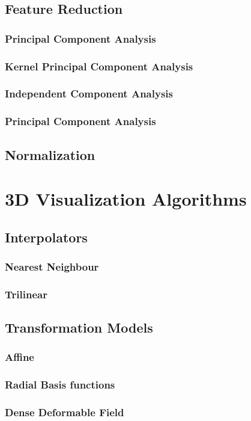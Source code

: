 \documentclass[11pt]{article}
\begin{document}
\subsection{Feature Reduction}
\subsubsection{Principal Component Analysis}
\subsubsection{Kernel Principal Component Analysis}
\subsubsection{Independent Component Analysis}
\subsubsection{Principal Component Analysis}
\subsection{Normalization}


\section{3D Visualization Algorithms}
\subsection{Interpolators}
\subsubsection{Nearest Neighbour}
\subsubsection{Trilinear}
\subsection{Transformation Models}
\subsubsection{Affine}
\subsubsection{Radial Basis functions}
\subsubsection{Dense Deformable Field}
\end{document}
